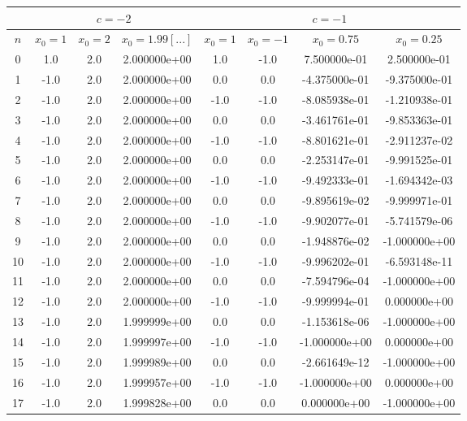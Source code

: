 \documentclass[12pt]{article}
\begin{document}
\newpage
\begin{table}[!h]
\centering
\footnotesize
    \label{tab:table8}
    \begin{tabular}{|c|c|c|c|c|c|c|c|}
    		\hline
    		 & \multicolumn{3}{|c|}{$c=-2$} & \multicolumn{4}{|c|}{$c=-1$}\\
    		\hline
    		$n$& $x_0=1$ & $x_0=2$ & $x_0=1.99[...]$ & $x_0=1$ & $x_0=-1$ & $x_0=0.75$ & $x_0=0.25$\\
    		\hline
0 & 1.0 & 2.0 & 2.000000e+00 & 1.0 & -1.0 & 7.500000e-01 & 2.500000e-01\\
\hline
1 & -1.0 & 2.0 & 2.000000e+00 & 0.0 & 0.0 & -4.375000e-01 & -9.375000e-01\\
\hline
2 & -1.0 & 2.0 & 2.000000e+00 & -1.0 & -1.0 & -8.085938e-01 & -1.210938e-01\\
\hline
3 & -1.0 & 2.0 & 2.000000e+00 & 0.0 & 0.0 & -3.461761e-01 & -9.853363e-01\\
\hline
4 & -1.0 & 2.0 & 2.000000e+00 & -1.0 & -1.0 & -8.801621e-01 & -2.911237e-02\\
\hline
5 & -1.0 & 2.0 & 2.000000e+00 & 0.0 & 0.0 & -2.253147e-01 & -9.991525e-01\\
\hline
6 & -1.0 & 2.0 & 2.000000e+00 & -1.0 & -1.0 & -9.492333e-01 & -1.694342e-03\\
\hline
7 & -1.0 & 2.0 & 2.000000e+00 & 0.0 & 0.0 & -9.895619e-02 & -9.999971e-01\\
\hline
8 & -1.0 & 2.0 & 2.000000e+00 & -1.0 & -1.0 & -9.902077e-01 & -5.741579e-06\\
\hline
9 & -1.0 & 2.0 & 2.000000e+00 & 0.0 & 0.0 & -1.948876e-02 & -1.000000e+00\\
\hline
10 & -1.0 & 2.0 & 2.000000e+00 & -1.0 & -1.0 & -9.996202e-01 & -6.593148e-11\\
\hline
11 & -1.0 & 2.0 & 2.000000e+00 & 0.0 & 0.0 & -7.594796e-04 & -1.000000e+00\\
\hline
12 & -1.0 & 2.0 & 2.000000e+00 & -1.0 & -1.0 & -9.999994e-01 & 0.000000e+00\\
\hline
13 & -1.0 & 2.0 & 1.999999e+00 & 0.0 & 0.0 & -1.153618e-06 & -1.000000e+00\\
\hline
14 & -1.0 & 2.0 & 1.999997e+00 & -1.0 & -1.0 & -1.000000e+00 & 0.000000e+00\\
\hline
15 & -1.0 & 2.0 & 1.999989e+00 & 0.0 & 0.0 & -2.661649e-12 & -1.000000e+00\\
\hline
16 & -1.0 & 2.0 & 1.999957e+00 & -1.0 & -1.0 & -1.000000e+00 & 0.000000e+00\\
\hline
17 & -1.0 & 2.0 & 1.999828e+00 & 0.0 & 0.0 & 0.000000e+00 & -1.000000e+00\\

\end{tabular}
\end{table}
\end{document}

